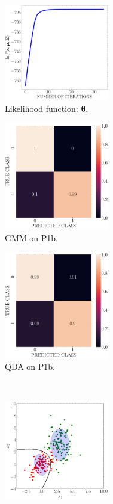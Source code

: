 \documentclass[11pt, a4 paper]{article}
\newcommand{\btheta}{\boldsymbol{\theta}}
\begin{document}
\begin{figure}[!htbp]
\centering
\quad
    \begin{subfigure}[!htbp]{0.24\textwidth}
       \centering
       \includegraphics[width=1.8in]{../results/ex1/loss_GMM_EM_dataset_P1b_size_199.pdf}
       \caption{Likelihood function: $\btheta$.}
       \label{fig:gmmLoss}
    \end{subfigure}
\quad    
    \begin{subfigure}[!htbp]{0.24\textwidth}
       \centering
       \includegraphics[width=1.8in]{../results/ex1/conf_mtx_GMM_EM_dataset_P1b_size_199.pdf}
       \caption{GMM on P1b.}
       \label{fig:GMM_P1b}
    \end{subfigure}
\quad    
    \begin{subfigure}[!htbp]{0.24\textwidth}
       \centering
       \includegraphics[width=1.8in]{../results/ex1/conf_mtx_QD_ML_dataset_P1b_size_199.pdf}
       \caption{QDA on P1b.}
       \label{fig:GMM_QDA_P1b}
    \end{subfigure}
\\
    \begin{subfigure}[!htbp]{0.24\textwidth}
       \centering
       \includegraphics[width=1.8in]{../results/ex1/samples_GMM_EM_dataset_P1b_size_199.pdf}

\end{subfigure}
\end{figure}
\end{document}
